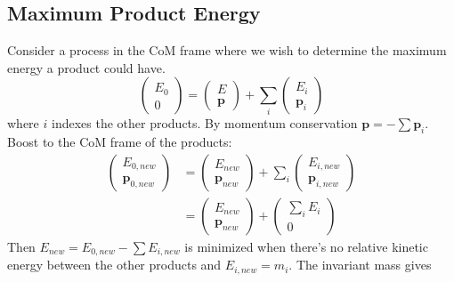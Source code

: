 \documentclass[12pt]{article}
\theoremstyle{definition}
\begin{document}
\subsection{Maximum Product Energy}
Consider a process in the CoM frame where we wish to determine the maximum energy a product could have.
\begin{equation*}
    \begin{pmatrix}
        E_0 \\ 0
    \end{pmatrix}
    =
    \begin{pmatrix}
        E \\ \bm{p}
    \end{pmatrix}
    + \sum_i
    \begin{pmatrix}
        E_i \\ \bm{p}_i
    \end{pmatrix}
\end{equation*}
where $i$ indexes the other products. By momentum conservation $\bm{p} = -\sum \bm{p}_i$. Boost to the
CoM frame of the products:
\begin{equation*}
\begin{split}
    \begin{pmatrix}
        E_{0,new} \\ \bm{p}_{0,new}
    \end{pmatrix}
        &=
            \begin{pmatrix}
                E_{new} \\ \bm{p}_{new}
            \end{pmatrix}
            + \sum_i
            \begin{pmatrix}
                E_{i,new} \\ \bm{p}_{i,new}
            \end{pmatrix} \\
        &=
             \begin{pmatrix}
                E_{new} \\ \bm{p}_{new}
            \end{pmatrix}
            +
            \begin{pmatrix}
                \sum_i E_i \\ 0
            \end{pmatrix}
\end{split}
\end{equation*}
Then $E_{new} = E_{0,new} - \sum E_{i,new}$ is minimized when there's no relative kinetic energy between the
other products and $E_{i,new} = m_i$. The invariant mass gives
\end{document}

